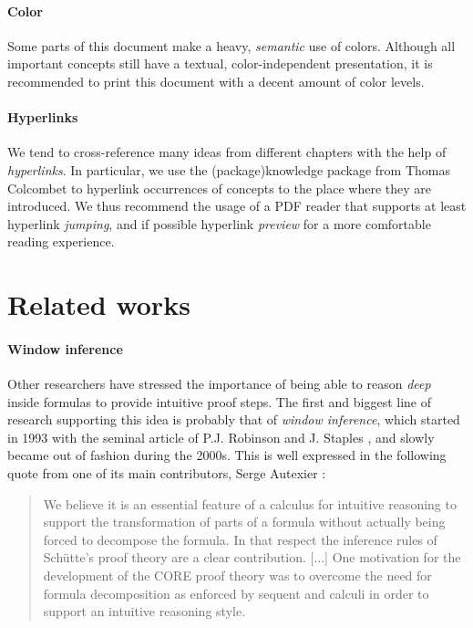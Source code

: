 \paragraph{Color}

Some parts of this document make a heavy, \emph{semantic} use of colors.
Although all important concepts still have a textual, color-independent
presentation, it is recommended to print this document with a decent amount of
color levels.

\paragraph{Hyperlinks}
  
We tend to cross-reference many ideas from different chapters with the help of
\emph{hyperlinks}. In particular, we use the \kl(package){knowledge} package
from Thomas Colcombet to hyperlink occurrences of concepts to the place where
they are introduced. We thus recommend the usage of a PDF reader that supports
at least hyperlink \emph{jumping}, and if possible hyperlink \emph{preview} for
a more comfortable reading experience.


\section{Related works}

\paragraph{Window inference}

Other researchers have stressed the importance of being able to reason
\emph{deep} inside formulas to provide intuitive proof steps. The first and
biggest line of research supporting this idea is probably that of \emph{window
inference}, which started in 1993 with the seminal article of P.J. Robinson and
J. Staples , and slowly became out of
fashion during the 2000s. This is well expressed in the following quote from one
of its main contributors, Serge Autexier :

\begin{quote}
We believe it is an essential feature of a calculus for intuitive reasoning to
support the transformation of parts of a formula without actually being forced
to decompose the formula. In that respect the inference rules of Schütte's proof
theory are a clear contribution. [...] One motivation for the development of the
CORE proof theory was to overcome the need for formula decomposition as enforced
by sequent and  calculi in order to support an intuitive
reasoning style.
\end{quote}

